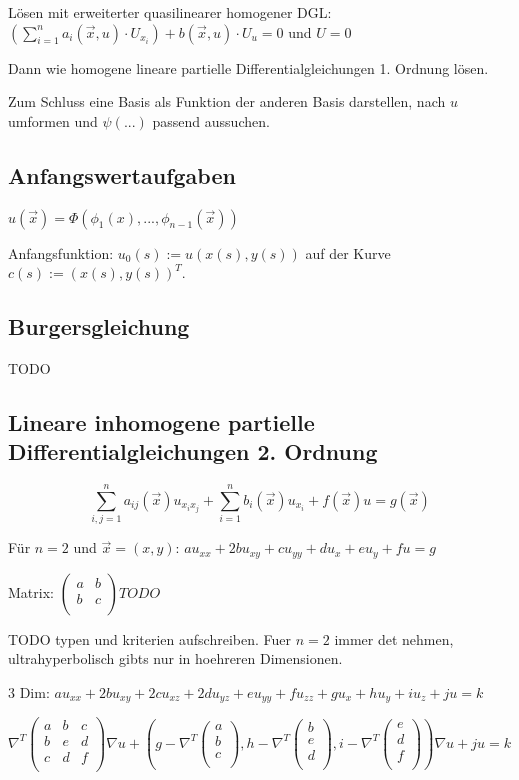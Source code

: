 \documentclass[10pt,a4paper]{article}
\begin{document}
Lösen mit erweiterter quasilinearer homogener DGL: $\left( \sum\limits_{i=1}^n a_i(\vec{x}, u)\cdot U_{x_i} \right) + b(\vec{x}, u)\cdot U_u = 0$ und $U = 0$

Dann wie homogene lineare partielle Differentialgleichungen 1. Ordnung lösen.

Zum Schluss eine Basis als Funktion der anderen Basis darstellen, nach $u$ umformen und $\psi(...)$ passend aussuchen.

\subsection{Anfangswertaufgaben}
$u(\vec{x}) = \Phi(\phi_1({x}), ... , \phi_{n-1}(\vec{x}))$

Anfangsfunktion: $u_0(s) := u(x(s), y(s))$ auf der Kurve $c(s) := (x(s), y(s))^T$.

\subsection{Burgersgleichung}
TODO

\subsection{Lineare inhomogene partielle Differentialgleichungen 2. Ordnung}
\[
\sum\limits_{i,j=1}^n a_{ij}(\vec{x})u_{x_ix_j} + \sum\limits_{i=1}^n b_i(\vec{x}) u_{x_i} + f(\vec{x})u = g(\vec{x})
\]

Für $n=2$ und $\vec{x}=(x,y)$: $au_{xx} +2bu_{xy}+cu_{yy} + du_x+eu_y+fu=g$

Matrix: $
\left(
\begin{matrix}
a & b \\
b & c \\
\end{matrix}
\right)
TODO
$

TODO typen und kriterien aufschreiben. Fuer $n=2$ immer det nehmen, ultrahyperbolisch gibts nur in hoehreren Dimensionen.

3 Dim: $au_{xx}+2bu_{xy}+2cu_{xz}+2du_{yz}+eu_{yy}+fu_{zz}+gu_x +hu_y+iu_z+ju=k$

$\nabla^T
\begin{pmatrix}
a & b&c \\
b & e&d \\
c&d&f\\
\end{pmatrix}
\nabla u+\left(g - \nabla^T \begin{pmatrix}
a\\b\\c\\
\end{pmatrix}, h - \nabla^T \begin{pmatrix}
b\\e\\d\\
\end{pmatrix},i - \nabla^T \begin{pmatrix}
e\\d\\f\\
\end{pmatrix}\right)\nabla u + ju = k$
\end{document}
